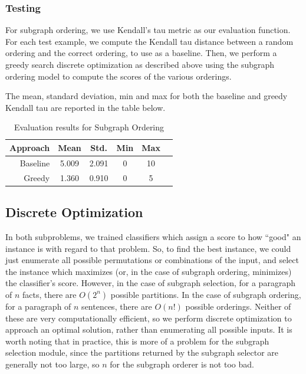 \documentclass[12pt]{article}
\begin{document}
\subsubsection{Testing}

For subgraph ordering, we use Kendall's tau metric as our evaluation function.
For each test example, we compute the Kendall tau distance between a random
ordering and the correct ordering, to use as a baseline. Then, we perform a
greedy search discrete optimization as described above using the subgraph
ordering model to compute the scores of the various orderings.

The mean, standard deviation, min and max for both the baseline and greedy
Kendall tau  are reported in the table below.

\begin{table}
\centering
\begin{tabular}{|r|c|c|c|c|c|}
\hline
Approach & Mean  & Std.  & Min & Max \\ \hline\hline
Baseline & 5.009 & 2.091 & 0   & 10  \\ \hline
Greedy   & 1.360 & 0.910 & 0   & 5   \\ \hline
\end{tabular}
\caption{Evaluation results for Subgraph Ordering}
\end{table}


\subsection{Discrete Optimization}

In both subproblems, we trained classifiers which assign a score to how ``good"
an instance is with regard to that problem. So, to find the best instance, we
could just enumerate all possible permutations or combinations of the input,
and select the instance which maximizes (or, in the case of subgraph ordering,
minimizes) the classifier's score. However, in the case of subgraph selection,
for a paragraph of $n$ facts, there are $O(2^n)$ possible partitions. In the
case of subgraph ordering, for a paragraph of $n$ sentences, there are $O(n!)$
possible orderings. Neither of these are very computationally efficient, so we
perform discrete optimization to approach an optimal solution, rather than
enumerating all possible inputs. It is worth noting that in practice, this is
more of a problem for the subgraph selection module, since the partitions
returned by the subgraph selector are generally not too large, so $n$ for the
subgraph orderer is not too bad.
\end{document}
